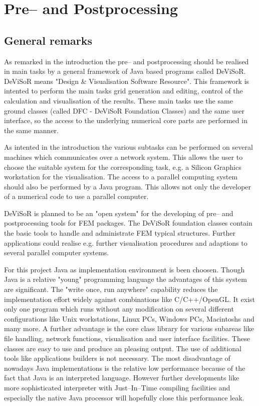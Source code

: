 \section{Pre-- and Postprocessing}

\subsection{General remarks}
%
As remarked in the introduction the pre-- and postprocessing should
be realised in main tasks by a general framework of Java based programs 
called DeViSoR. DeViSoR means "Design \& Visualisation Software Resource".
This framework is intented to perform the main tasks grid generation and
editing, control of the calculation and visualisation of the results. 
These main tasks use the same ground classes (called DFC - DeViSoR Foundation
Classes) and the same user interface, so the access to the underlying 
numerical core parts are  performed in the same manner.

As intented in the introduction the various subtasks can be performed on
several machines which communicates over a network system. This allows
the user to choose the suitable system for the corresponding task, e.g.
a Silicon Graphics workstation for the visualisation. The access to
a parallel computing system should also be performed by a Java program.
This allows not only the developer of a numerical code to use a
parallel computer.

DeViSoR is planned to be an "open system" for the developing of pre-- and
postprocessing tools for FEM packages. The DeViSoR foundation classes
contain the basic tools to handle and administrate FEM typical structures.
Further applications could realise e.g. further visualisation procedures
and adaptions to several parallel computer systems.

For this project Java as implementation environment is been choosen. Though Java
is a relative "young" programming language the advantages of this system
are significant. The "write once, run anywhere" capability reduces the
implementation effort widely against combinations like C/C++/OpenGL. It
exist only one program which runs without any modification on several
different configurations like Unix workstations, Linux PCs, Windows PCs,
Macintoshs and many more. A further advantage is the core
class library for various subareas like file hand\-ling, network functions,
visualisation and user interface facilities. These classes are easy to use and
produce an pleasing output. The use of additional tools like applications
builders is not necessary. The most disadvantage of nowadays Java
implementations is the relative low performance because of the fact that
Java is an interpreted language.  However further developments like
more sophisticated interpreter with Just--In--Time compiling facilities and
especially the native Java processor will hopefully close this 
performance leak.

